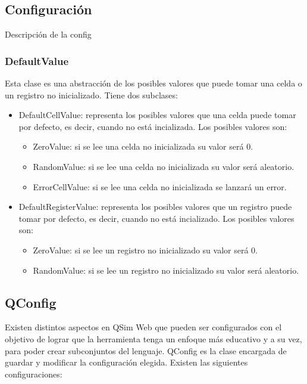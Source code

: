 \subsection{Configuración}
\label{subsec:config}
Descripción de la config

\subsubsection{DefaultValue}
Esta clase es una abstracción de los posibles valores que puede tomar una celda o un registro no inicializado. Tiene dos subclases:
\begin{itemize}
  \item DefaultCellValue: representa los posibles valores que una celda puede tomar por defecto, es decir, cuando no está incializada. Los posibles valores son:
  \begin{itemize}
    \item ZeroValue: si se lee una celda no inicializada su valor será 0.
    \item RandomValue: si se lee una celda no inicializada su valor será aleatorio.
    \item ErrorCellValue: si se lee una celda no inicializada se lanzará un error.
  \end{itemize}
  \item DefaultRegisterValue: representa los posibles valores que un registro puede tomar por defecto, es decir, cuando no está incializado. Los posibles valores son:
  \begin{itemize}
    \item ZeroValue: si se lee un registro no inicializado su valor será 0.
    \item RandomValue: si se lee un registro no inicializado su valor será aleatorio.
  \end{itemize}
\end{itemize}

\subsection{QConfig}
\label{subsec:qconfig}
Existen distintos aspectos en QSim Web que pueden ser configurados con el objetivo de lograr que la herramienta tenga un enfoque más educativo y a su vez, para poder crear subconjuntos del lenguaje. QConfig es la clase encargada de guardar y modificar la configuración elegida.
Existen las siguientes configuraciones:

